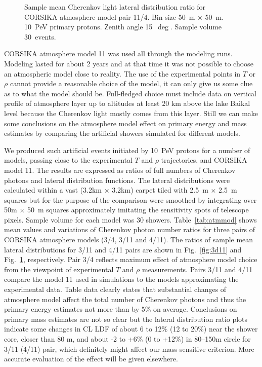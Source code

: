 \documentclass[final,5p,times,twocolumn]{elsarticle}
\begin{document}
\begin{figure}[tb]
\begin{minipage}[t]{0.48\textwidth}
    \vspace{-1.0pc}
    \caption{Sample mean Cherenkov light lateral distribution ratio for CORSIKA atmosphere model
    pair 11/4. Bin size 50~m $\times$ 50~m. 10~PeV primary protons. Zenith angle 15~$\deg$. Sample volume 30~events.}
\label{fig:4d11}
\end{minipage}
\end{figure}


CORSIKA atmosphere model 11 was used all through the modeling runs. Modeling lasted for about 2 years and at that time it was not possible to choose an atmospheric model close to reality. The use of the experimental points in $T$ or $\rho$ cannot provide a reasonable  choice of the model, it can only give us some clue as to what the model should be. Full-fledged choice must include data on vertical profile of atmosphere layer up to altitudes at least 20 km above the lake Baikal level because the Cherenkov light mostly comes from this layer. Still we can make some conclusions on the atmosphere model effect on primary energy and mass estimates by comparing the artificial showers simulated for different models.

We produced such artificial events initiated by 10~PeV protons for a number of models,  passing close to the experimental $T$ and $\rho$ trajectories, and CORSIKA model 11. The results are expressed as ratios of full numbers of Cherenkov photons and lateral distribution functions.
The lateral distributions were calculated within a vast (3.2km $\times$ 3.2km) carpet tiled with 2.5~m $\times$ 2.5~m squares but for the purpose of the comparison were smoothed by integrating over 50m $\times$ 50~m squares approximately imitating the sensitivity spots of telescope pixels.
Sample volume for each model was 30 showers. Table~\ref{tab:atmmod} shows mean values and variations of Cherenkov photon number ratios for three pairs of CORSIKA atmosphere models (3/4, 3/11 and 4/11). The ratios of sample mean lateral distributions for 3/11 and 4/11 pairs are shown in Fig.~\ref{fig:3d11} and Fig.~\ref{fig:4d11}, respectively. Pair 3/4 reflects maximum effect of atmosphere model choice from the viewpoint of experimental $T$ and $\rho$ measurements. Pairs 3/11 and 4/11 compare the model 11 used in simulations to the models approximating the experimental data.
Table data clearly states that substantial changes of atmosphere model affect the total number of Cherenkov photons and thus the primary energy estimates not more than by 5\% on average. Conclusions on primary mass estimates are not so clear but the lateral distribution ratio plots indicate some changes in CL LDF of about 6 to 12\% (12 to 20\%) near the shower core, closer than 80 m, and about -2 to +6\% (0 to +12\%) in 80--150m circle for 3/11 (4/11) pair, which definitely might affect our mass-sensitive criterion. More accurate evaluation of the effect will be given elsewhere.
\end{document}
